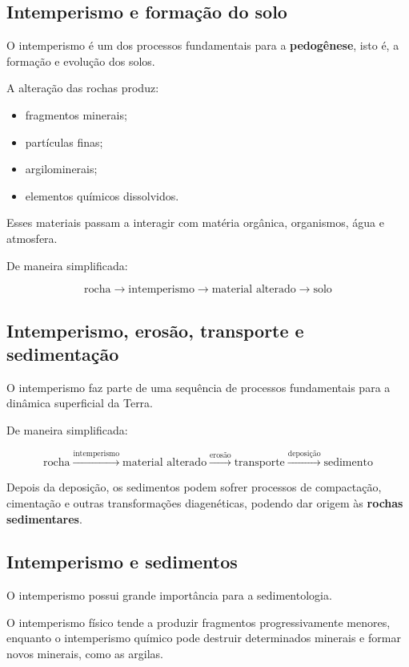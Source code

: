 \documentclass[a4paper,12pt]{article}
\theoremstyle{definition}
\theoremstyle{definition}
\theoremstyle{definition}
\begin{document}
\subsection{Intemperismo e formação do solo}

O intemperismo é um dos processos fundamentais para a \textbf{pedogênese}, isto é, a formação e evolução dos solos.

A alteração das rochas produz:

\begin{itemize}
    \item fragmentos minerais;
    \item partículas finas;
    \item argilominerais;
    \item elementos químicos dissolvidos.
\end{itemize}

Esses materiais passam a interagir com matéria orgânica, organismos, água e atmosfera.

De maneira simplificada:

\[
\boxed{
\text{rocha}
\rightarrow
\text{intemperismo}
\rightarrow
\text{material alterado}
\rightarrow
\text{solo}
}
\]

\subsection{Intemperismo, erosão, transporte e sedimentação}

O intemperismo faz parte de uma sequência de processos fundamentais para a dinâmica superficial da Terra.

De maneira simplificada:

\[
\boxed{
\text{rocha}
\xrightarrow{\text{intemperismo}}
\text{material alterado}
\xrightarrow{\text{erosão}}
\text{transporte}
\xrightarrow{\text{deposição}}
\text{sedimento}
}
\]

Depois da deposição, os sedimentos podem sofrer processos de compactação, cimentação e outras transformações diagenéticas, podendo dar origem às \textbf{rochas sedimentares}.

\subsection{Intemperismo e sedimentos}

O intemperismo possui grande importância para a sedimentologia.

O intemperismo físico tende a produzir fragmentos progressivamente menores, enquanto o intemperismo químico pode destruir determinados minerais e formar novos minerais, como as argilas.
\end{document}
